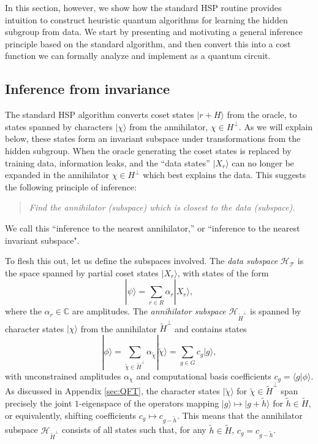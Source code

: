 \documentclass[aps, pre,reprint,nofootinbib,citeautoscript,floatfix]{revtex4-1}
\begin{document}
In this section, however, we show how the standard HSP routine provides intuition to construct  heuristic quantum algorithms for learning the hidden subgroup from data.
We start by presenting and motivating a general inference principle based on the standard algorithm, and then convert this into a cost function we can formally analyze and implement as a quantum circuit.

\subsection{Inference from invariance}
The standard HSP algorithm converts coset states $|r+H\rangle$ from the oracle, to states spanned by characters $|\chi\rangle$ from the annihilator, $\chi\in H^\perp$. As we will explain below, these states form an invariant subspace under transformations from the hidden subgroup.
When the oracle generating the coset states is replaced by training data, information leaks, and the ``data states'' $|X_r\rangle$ can no longer be expanded in the annihilator $\chi\in H^\perp$ which best explains the data. This suggests the following principle of inference:
\begin{quote}
    \textit{Find the annihilator (subspace) which is closest to the data (subspace).}
\end{quote}
We call this ``inference to the nearest annihilator,'' or ``inference to the nearest invariant subspace". 

To flesh this out, let us define the subspaces involved.
The \emph{data subspace} $\mathcal{H}_{\mathcal{T}}$ is the space spanned by partial coset states $|X_r\rangle$, with states of the form
\[
|\psi\rangle = \sum_{r\in R} \alpha_r |X_r\rangle,
\]
where the $\alpha_r \in \mathbb{C}$ are amplitudes.
The \emph{annihilator subspace} $\mathcal{H}_{\tilde{H}^\perp}$ is spanned by character states $|\chi\rangle$ 
from the annihilator $\tilde{H}^\perp$ and contains states
\[
|\phi\rangle = \sum_{\tilde{\chi}\in\tilde{H}^\perp} \alpha_{\tilde{\chi}} |\tilde{\chi}\rangle = \sum_{g\in G} c_g |g\rangle,
\] 
with unconstrained amplitudes $\alpha_{\chi}$ and computational basis coefficients $c_g = \langle g|\phi\rangle$.
As discussed in Appendix \ref{sec:QFT}, the character states $|\tilde{\chi}\rangle$ for $\tilde{\chi}\in \tilde{H}^\perp$ span precisely the joint $1$-eigenspace of the operators mapping $|g\rangle \mapsto |g+\tilde{h}\rangle$ for $\tilde{h}\in\tilde{H}$, or equivalently, shifting coefficients $c_g \mapsto c_{g-\tilde{h}}$.
This means that the annihilator subspace $\mathcal{H}_{\tilde{H}^\perp}$ consists of all states
such that, for any $\tilde{h}\in\tilde{H}$, $c_g = c_{g-\tilde{h}}$.
\end{document}
